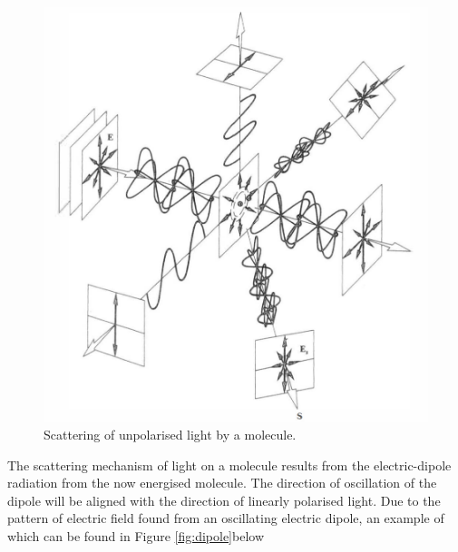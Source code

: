 \documentclass{article}
\begin{document}
\begin{figure}[H]
    \centering
    \includegraphics[scale=0.5]{scattering.png}
    \caption{Scattering of unpolarised light by a molecule.}
    \label{fig:scatter}
\end{figure}

The scattering mechanism of light on a molecule results from 
the electric-dipole radiation from the now energised molecule.
The direction of oscillation of the dipole will be aligned with 
the direction of linearly polarised light. Due to the pattern 
of electric field found from an oscillating electric dipole, an 
example of which can be found in Figure \ref{fig:dipole}below
\end{document}
